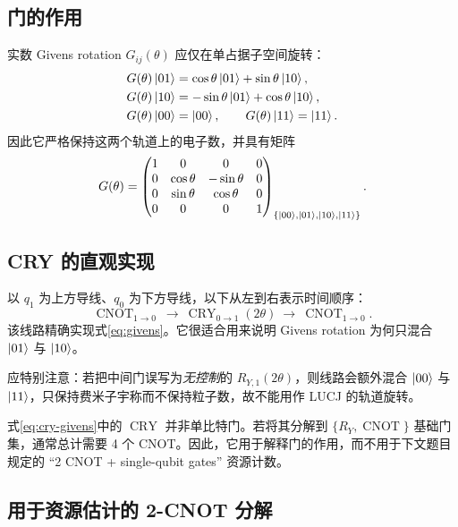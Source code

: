 \documentclass[11pt,a4paper]{ctexart}
\newcommand{\CNOT}{\operatorname{CNOT}}
\newcommand{\CRY}{\operatorname{CRY}}
\begin{document}
\subsection{门的作用}

实数 Givens rotation $G_{ij}(\theta)$ 应仅在单占据子空间旋转：
\begin{align}
G(\theta)\ket{01}&=\cos\theta\ket{01}+\sin\theta\ket{10},\\
G(\theta)\ket{10}&=-\sin\theta\ket{01}+\cos\theta\ket{10},\\
G(\theta)\ket{00}&=\ket{00},\qquad G(\theta)\ket{11}=\ket{11}.
\end{align}
因此它严格保持这两个轨道上的电子数，并具有矩阵
\begin{equation}
G(\theta)=
\begin{pmatrix}
1&0&0&0\\
0&\cos\theta&-\sin\theta&0\\
0&\sin\theta&\cos\theta&0\\
0&0&0&1
\end{pmatrix}_{\{\ket{00},\ket{01},\ket{10},\ket{11}\}}.
\label{eq:givens}
\end{equation}

\subsection{CRY 的直观实现}

以 $q_1$ 为上方导线、$q_0$ 为下方导线，以下从左到右表示时间顺序：
\begin{equation}
\boxed{
\CNOT_{1\to0}\ \longrightarrow\ \CRY_{0\to1}(2\theta)\ \longrightarrow\ \CNOT_{1\to0}.
}
\label{eq:cry-givens}
\end{equation}
该线路精确实现式\eqref{eq:givens}。它很适合用来说明 Givens rotation 为何只混合 $\ket{01}$ 与 $\ket{10}$。

应特别注意：若把中间门误写为\emph{无控制}的 $R_{Y,1}(2\theta)$，则线路会额外混合 $\ket{00}$ 与 $\ket{11}$，只保持费米子宇称而不保持粒子数，故不能用作 LUCJ 的轨道旋转。

式\eqref{eq:cry-givens}中的 $\CRY$ 并非单比特门。若将其分解到 $\{R_Y,\CNOT\}$ 基础门集，通常总计需要 4 个 CNOT。因此，它用于解释门的作用，而不用于下文题目规定的 ``2 CNOT + single-qubit gates'' 资源计数。

\subsection{用于资源估计的 2-CNOT 分解}
\end{document}
